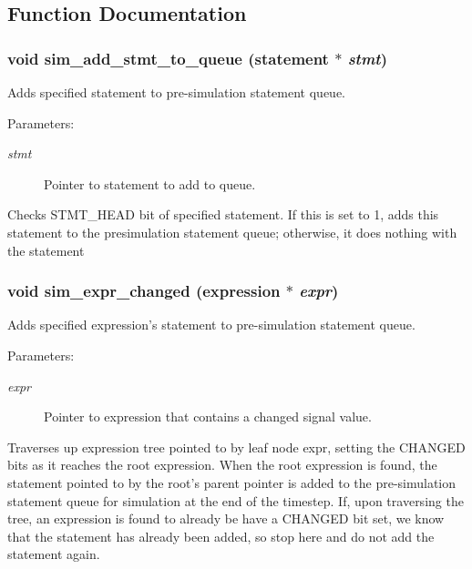 \subsection{Function Documentation}
\subsubsection{\setlength{\rightskip}{0pt plus 5cm}void sim\_\-add\_\-stmt\_\-to\_\-queue ({\bf statement} $\ast$ {\em stmt})}\label{sim_8c_a4}


Adds specified statement to pre-simulation statement queue.

\begin{Desc}
\item[Parameters: ]\par
\begin{description}
\item[{\em 
stmt}]Pointer to statement to add to queue.\end{description}
\end{Desc}
Checks STMT\_\-HEAD bit of specified statement. If this is set to 1, adds this statement to the presimulation statement queue; otherwise, it does nothing with the statement 
\subsubsection{\setlength{\rightskip}{0pt plus 5cm}void sim\_\-expr\_\-changed ({\bf expression} $\ast$ {\em expr})}\label{sim_8c_a3}


Adds specified expression's statement to pre-simulation statement queue.

\begin{Desc}
\item[Parameters: ]\par
\begin{description}
\item[{\em 
expr}]Pointer to expression that contains a changed signal value.\end{description}
\end{Desc}
Traverses up expression tree pointed to by leaf node expr, setting the CHANGED bits as it reaches the root expression. When the root expression is found, the statement pointed to by the root's parent pointer is added to the pre-simulation statement queue for simulation at the end of the timestep. If, upon traversing the tree, an expression is found to already be have a CHANGED bit set, we know that the statement has already been added, so stop here and do not add the statement again. 
